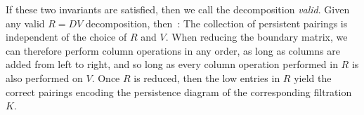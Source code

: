 \documentclass{article} %
\newtheorem{proposition}{Proposition}
\begin{document}
 \vspace*{1em}
 If these two invariants are satisfied, then we call the decomposition \emph{valid}. Given any valid $R = D V$ decomposition, then~\cite{zomorodian2005computing}:
\noindent
The collection of persistent pairings is independent of the choice of $R$ and $V$. When reducing the boundary matrix, we can therefore perform column operations in any order, as long as columns are added from left to right, and so long as every column operation performed in $R$ is also performed on $V$. 
Once $R$ is reduced, then the low entries in $R$ yield the correct pairings encoding the persistence diagram of the corresponding filtration $K$.
\end{document}

